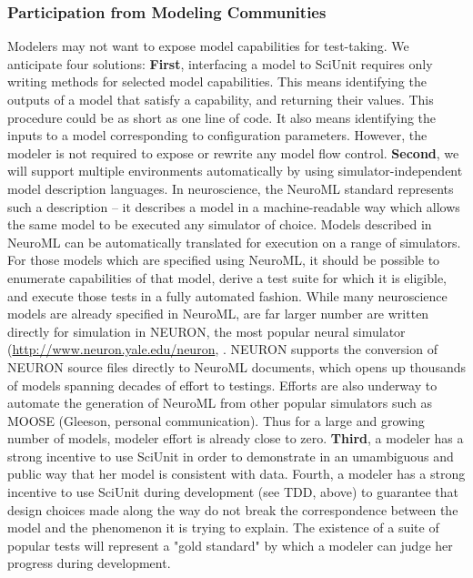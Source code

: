 \documentclass[11pt,letterpaper]{article}
\begin{document}
\subsubsection{Participation from Modeling Communities}
Modelers may not want to expose model capabilities for test-taking.  We anticipate four solutions: \textbf{First}, interfacing a model to SciUnit requires only writing methods for selected model capabilities.  This means identifying the outputs of a model that satisfy a capability, and returning their values.  This procedure could be as short as one line of code.  It also means identifying the inputs to a model corresponding to configuration parameters.  However, the modeler is not required to expose or rewrite any model flow control.  \textbf{Second}, we will support multiple environments automatically by using simulator-independent model description languages. In neuroscience, the NeuroML standard represents such a description \cite{gleeson2010} -- it describes a model in a machine-readable way which allows the same model to be executed any simulator of choice.  Models described in NeuroML can be automatically translated for execution on a range of simulators.  For those models which are specified using NeuroML, it should be possible to enumerate capabilities of that model, derive a test suite for which it is eligible, and execute those tests in a fully automated fashion.  While many neuroscience models are already specified in NeuroML, are far larger number are written directly for simulation in NEURON, the most popular neural simulator (\url{http://www.neuron.yale.edu/neuron}, \cite{carnevale2006}.  NEURON supports the conversion of NEURON source files directly to NeuroML documents, which opens up thousands of models spanning decades of effort to testings.  Efforts are also underway to automate the generation of NeuroML from other popular simulators such as MOOSE (Gleeson, personal communication).  Thus for a large and growing number of models, modeler effort is already close to zero.  \textbf{Third}, a modeler has a strong incentive to use SciUnit in order to demonstrate in an umambiguous and public way that her model is consistent with data.  Fourth, a modeler has a strong incentive to use SciUnit during development (see TDD, above) to guarantee that design choices made along the way do not break the correspondence between the model and the phenomenon it is trying to explain.  The existence of a suite of popular tests will represent a "gold standard" by which a modeler can judge her progress during development.
\end{document}
